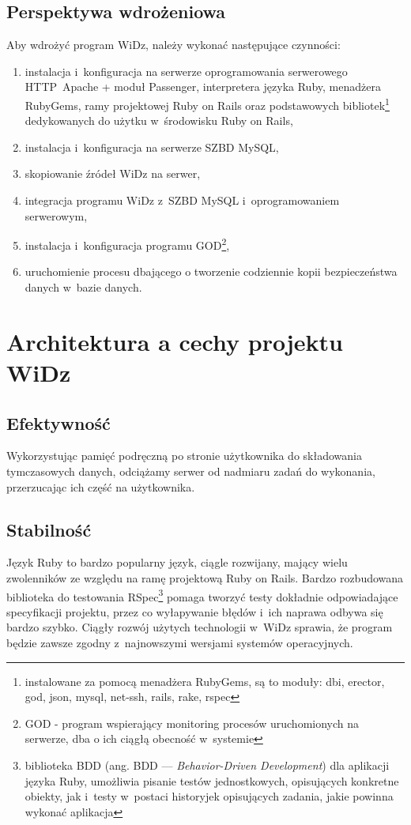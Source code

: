 \documentclass[12pt,leqno,twoside]{mwart}
\begin{document}
\subsection{Perspektywa wdrożeniowa}
\noindent Aby wdrożyć program WiDz, należy wykonać następujące czynności:
\begin{enumerate}
	\item instalacja i~konfiguracja na serwerze oprogramowania serwerowego \hbox{HTTP Apache} + moduł Passenger, interpretera języka Ruby, menadżera RubyGems, ramy projektowej Ruby on Rails oraz podstawowych bibliotek\footnote{instalowane za pomocą menadżera RubyGems, są to moduły: dbi, erector, god, json, mysql, net-ssh, rails, rake, rspec} dedykowanych do użytku w~środowisku Ruby on Rails,
	\item instalacja i~konfiguracja na serwerze SZBD MySQL,
	\item skopiowanie źródeł WiDz na serwer,
	\item integracja programu WiDz z~SZBD MySQL i~oprogramowaniem serwerowym,
	\item instalacja i~konfiguracja programu GOD\footnote{GOD - program wspierający monitoring procesów uruchomionych na serwerze, dba o ich ciągłą obecność w~systemie},
	\item uruchomienie procesu dbającego o tworzenie codziennie kopii bezpieczeństwa danych w~bazie danych.
\end{enumerate}

\section{Architektura a cechy projektu WiDz}
\subsection{Efektywność}
\noindent Wykorzystując pamięć podręczną po stronie użytkownika do składowania tymczasowych danych, odciążamy serwer od nadmiaru zadań do wykonania, przerzucając ich część na użytkownika.
 
\subsection{Stabilność}
\noindent Język Ruby to bardzo popularny język, ciągle rozwijany, mający wielu zwolenników ze względu na ramę projektową Ruby on Rails. Bardzo rozbudowana biblioteka do testowania RSpec\footnote{biblioteka BDD (ang. BDD --- \textit{Behavior-Driven Development}) dla aplikacji języka Ruby, umożliwia pisanie testów jednostkowych, opisujących konkretne obiekty, jak i~testy w~postaci historyjek opisujących zadania, jakie powinna wykonać aplikacja } pomaga tworzyć testy dokładnie odpowiadające specyfikacji projektu, przez co wyłapywanie błędów i~ich naprawa odbywa się bardzo szybko. Ciągły rozwój użytych technologii w~WiDz sprawia, że program będzie zawsze zgodny z~najnowszymi wersjami systemów operacyjnych.
\end{document}

